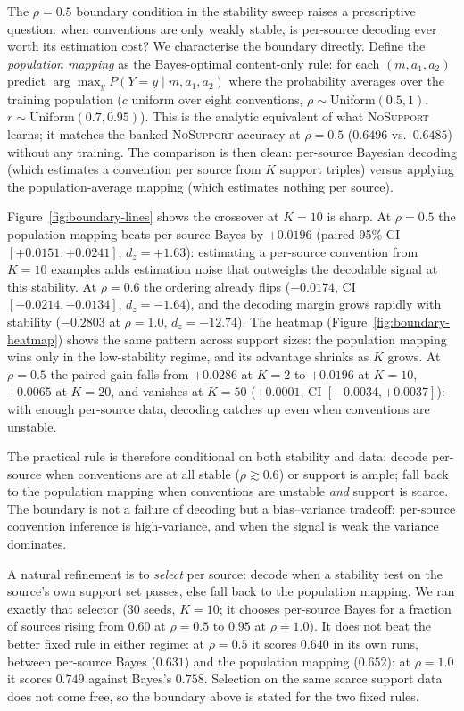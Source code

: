 The $\rho=0.5$ boundary condition in the stability sweep raises a
prescriptive question: when conventions are only weakly stable, is
per-source decoding ever worth its estimation cost? We characterise the
boundary directly. Define the \emph{population mapping} as the
Bayes-optimal content-only rule: for each $(m, a_1, a_2)$ predict
$\arg\max_y P(Y=y \mid m, a_1, a_2)$ where the probability averages over
the training population ($c$ uniform over eight conventions,
$\rho \sim \mathrm{Uniform}(0.5, 1)$, $r \sim \mathrm{Uniform}(0.7,
0.95)$). This is the analytic equivalent of what \textsc{NoSupport}
learns; it matches the banked \textsc{NoSupport} accuracy at $\rho=0.5$
($0.6496$ vs.\ $0.6485$) without any training. The comparison is then
clean: per-source Bayesian decoding (which estimates a convention per
source from $K$ support triples) versus applying the population-average
mapping (which estimates nothing per source).

Figure~\ref{fig:boundary-lines} shows the crossover at $K=10$ is sharp.
At $\rho=0.5$ the population mapping beats per-source Bayes by
$+0.0196$ (paired 95\% CI $[+0.0151, +0.0241]$, $d_z = +1.63$): estimating
a per-source convention from $K=10$ examples adds estimation noise that
outweighs the decodable signal at this stability. At $\rho=0.6$ the ordering already
flips ($-0.0174$, CI $[-0.0214, -0.0134]$, $d_z = -1.64$), and the
decoding margin grows rapidly with stability ($-0.2803$ at $\rho=1.0$,
$d_z = -12.74$). The heatmap (Figure~\ref{fig:boundary-heatmap}) shows
the same pattern across support sizes: the population mapping wins only
in the low-stability regime, and its advantage shrinks as $K$ grows.
At $\rho=0.5$ the paired gain falls from $+0.0286$ at $K=2$ to $+0.0196$
at $K=10$, $+0.0065$ at $K=20$, and vanishes at $K=50$ ($+0.0001$, CI
$[-0.0034, +0.0037]$): with enough per-source data, decoding catches up
even when conventions are unstable.

The practical rule is therefore conditional on both stability and data:
decode per-source when conventions are at all stable ($\rho \gtrsim
0.6$) or support is ample; fall back to the population mapping when
conventions are unstable \emph{and} support is scarce. The boundary is
not a failure of decoding but a bias--variance tradeoff: per-source
convention inference is high-variance, and when the signal is weak the
variance dominates.

A natural refinement is to \emph{select} per source: decode when a
stability test on the source's own support set passes, else fall back
to the population mapping. We ran exactly that selector (30 seeds,
$K=10$; it chooses per-source Bayes for a fraction of sources rising
from $0.60$ at $\rho=0.5$ to $0.95$ at $\rho=1.0$). It does not beat
the better fixed rule in either regime: at $\rho=0.5$ it scores
$0.640$ in its own runs, between per-source Bayes ($0.631$) and the
population mapping ($0.652$); at $\rho=1.0$ it scores $0.749$ against
Bayes's $0.758$. Selection on the same scarce support data does not
come free, so the boundary above is stated for the two fixed rules.

